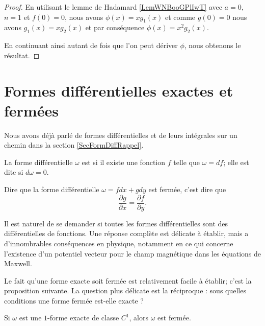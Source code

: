 \begin{proof}
    En utilisant le lemme de Hadamard \ref{LemWNBooGPlIwT} avec \( a=0\), \( n=1\) et \( f(0)=0\), nous avons \( \phi(x)=xg_1(x)\) et comme \( g(0)=0\) nous avons \( g_1(x)=xg_2(x)\) et par conséquence \( \phi(x)=x^2g_2(x)\).

    En continuant ainsi autant de fois que l'on peut dériver \( \phi\), nous obtenons le résultat.
\end{proof}

\section{Formes différentielles exactes et fermées}

Nous avons déjà parlé de formes différentielles et de leurs intégrales sur un chemin dans la section \ref{SecFormDiffRappel}.

\begin{definition}  \label{DefEFKQmPs}
La forme différentielle $\omega$ est  si il existe une fonction $f$ telle que $\omega=df$; elle est dite  si $d\omega=0$.
\end{definition}

Dire que la forme différentielle $\omega=fdx+gdy$ est fermée, c'est dire que
\begin{equation}
    \frac{ \partial g }{ \partial x }=\frac{ \partial f }{ \partial y }.
\end{equation}

Il est naturel de se demander si toutes les formes différentielles sont des différentielles de fonctions. Une réponse complète est délicate à établir, mais a d'innombrables conséquences en physique, notamment en ce qui concerne l'existence d'un potentiel vecteur pour le champ magnétique dans les équations de Maxwell.

Le fait qu'une forme exacte soit fermée est relativement facile à établir; c'est la proposition suivante. La question plus délicate est la réciproque : sous quelles conditions une forme fermée est-elle exacte ?
\begin{proposition}
	Si $\omega$ est une $1$-forme exacte de classe $C^1$, alors $\omega$ est fermée.
\end{proposition}

